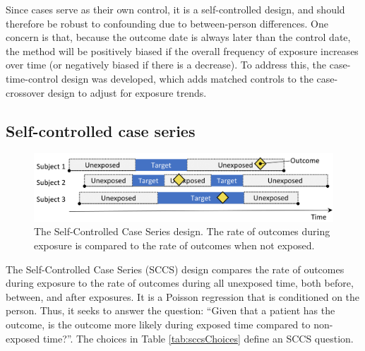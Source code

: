 \documentclass[]{book}
\begin{document}
Since cases serve as their own control, it is a self-controlled design,
and should therefore be robust to confounding due to between-person
differences. One concern is that, because the outcome date is always
later than the control date, the method will be positively biased if the
overall frequency of exposure increases over time (or negatively biased
if there is a decrease). To address this, the case-time-control design
\citep{suissa_1995} was developed, which adds matched controls to the
case-crossover design to adjust for exposure trends.

\subsection{Self-controlled case
series}\label{self-controlled-case-series}

\begin{figure}

{\centering \includegraphics[width=0.9\linewidth]{images/PopulationLevelEstimation/selfControlledCaseSeries} 

}

\caption{The Self-Controlled Case Series design. The rate of outcomes during exposure is compared to the rate of outcomes when not exposed.}\label{fig:selfControlledCaseSeries}
\end{figure}

The Self-Controlled Case Series (SCCS) design
\citep[whitaker\_2006]{farrington_1995} compares the rate of outcomes
during exposure to the rate of outcomes during all unexposed time, both
before, between, and after exposures. It is a Poisson regression that is
conditioned on the person. Thus, it seeks to answer the question:
``Given that a patient has the outcome, is the outcome more likely
during exposed time compared to non-exposed time?''. The choices in
Table \ref{tab:sccsChoices} define an SCCS question.
\end{document}
